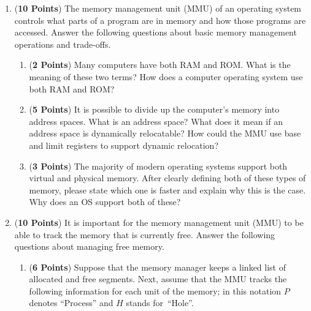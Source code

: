 \documentclass[12pt,epsf,psfig,graphics]{article}
\begin{document}
\begin{enumerate}
  
\item ({\bf 10 Points}) The memory management unit (MMU) of an operating system controls what parts of a program are in
  memory and how those programs are accessed.  Answer the following questions about basic memory management operations
  and trade-offs.
  
  \begin{enumerate}
          
  \item ({\bf 2 Points}) Many computers have both RAM and ROM.  What is the meaning of these two terms?  How does a
    computer operating system use both RAM and ROM?

  \item ({\bf 5 Points}) It is possible to divide up the computer's memory into address spaces.  What is an address
    space?  What does it mean if an address space is dynamically relocatable? How could the MMU use base and limit
    registers to support dynamic relocation?   

  \item ({\bf 3 Points}) The majority of modern operating systems support both virtual and physical memory.  After
    clearly defining both of these types of memory, please state which one is faster and explain why this is the case.
    Why does an OS support both of these?
    
  \end{enumerate}
        
\newpage

% 
\item ({\bf 10 Points}) It is important for the memory management unit (MMU) to be able to track the memory that is
  currently free.  Answer the following questions about managing free memory.

  \begin{enumerate}
          
  \item ({\bf 6 Points}) Suppose that the memory manager keeps a linked list of allocated and free segments.  Next,
    assume that the MMU tracks the following information for each unit of the memory; in this notation $P$
    denotes ``Process'' and $H$ stands \mbox{for ``Hole''}.


\end{enumerate}
\end{enumerate}
\end{document}
